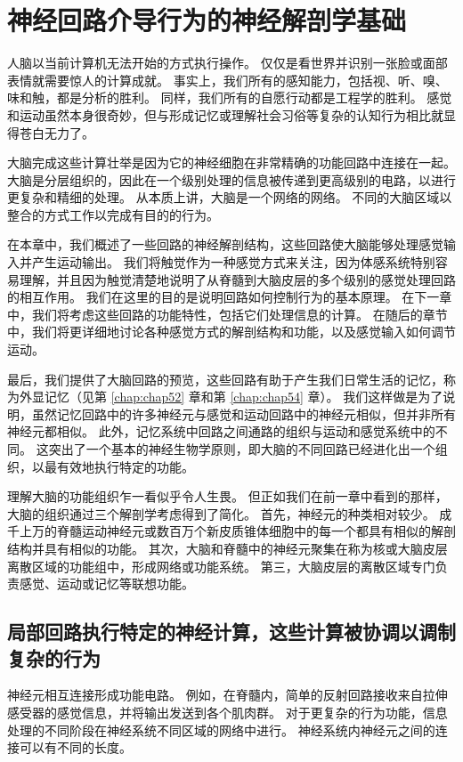 \chapter{神经回路介导行为的神经解剖学基础} \label{chap:chap4}

人脑以当前计算机无法开始的方式执行操作。 
仅仅是看世界并识别一张脸或面部表情就需要惊人的计算成就。
事实上，我们所有的感知能力，包括视、听、嗅、味和触，都是分析的胜利。
同样，我们所有的自愿行动都是工程学的胜利。 
感觉和运动虽然本身很奇妙，但与形成记忆或理解社会习俗等复杂的认知行为相比就显得苍白无力了。


大脑完成这些计算壮举是因为它的神经细胞在非常精确的功能回路中连接在一起。
大脑是分层组织的，因此在一个级别处理的信息被传递到更高级别的电路，以进行更复杂和精细的处理。 
从本质上讲，大脑是一个网络的网络。 
不同的大脑区域以整合的方式工作以完成有目的的行为。


在本章中，我们概述了一些回路的神经解剖结构，这些回路使大脑能够处理感觉输入并产生运动输出。
我们将触觉作为一种感觉方式来关注，因为体感系统特别容易理解，并且因为触觉清楚地说明了从脊髓到大脑皮层的多个级别的感觉处理回路的相互作用。
我们在这里的目的是说明回路如何控制行为的基本原理。 
在下一章中，我们将考虑这些回路的功能特性，包括它们处理信息的计算。 
在随后的章节中，我们将更详细地讨论各种感觉方式的解剖结构和功能，以及感觉输入如何调节运动。


最后，我们提供了大脑回路的预览，这些回路有助于产生我们日常生活的记忆，称为外显记忆（见第 \ref{chap:chap52} 章和第 \ref{chap:chap54} 章）。
我们这样做是为了说明，虽然记忆回路中的许多神经元与感觉和运动回路中的神经元相似，但并非所有神经元都相似。
此外，记忆系统中回路之间通路的组织与运动和感觉系统中的不同。
这突出了一个基本的神经生物学原则，即大脑的不同回路已经进化出一个组织，以最有效地执行特定的功能。


理解大脑的功能组织乍一看似乎令人生畏。 
但正如我们在前一章中看到的那样，大脑的组织通过三个解剖学考虑得到了简化。
首先，神经元的种类相对较少。 
成千上万的脊髓运动神经元或数百万个新皮质锥体细胞中的每一个都具有相似的解剖结构并具有相似的功能。 
其次，大脑和脊髓中的神经元聚集在称为核或大脑皮层离散区域的功能组中，形成网络或功能系统。 
第三，大脑皮层的离散区域专门负责感觉、运动或记忆等联想功能。


\section{局部回路执行特定的神经计算，这些计算被协调以调制复杂的行为}

神经元相互连接形成功能电路。 
例如，在脊髓内，简单的反射回路接收来自拉伸感受器的感觉信息，并将输出发送到各个肌肉群。 
对于更复杂的行为功能，信息处理的不同阶段在神经系统不同区域的网络中进行。 
神经系统内神经元之间的连接可以有不同的长度。



